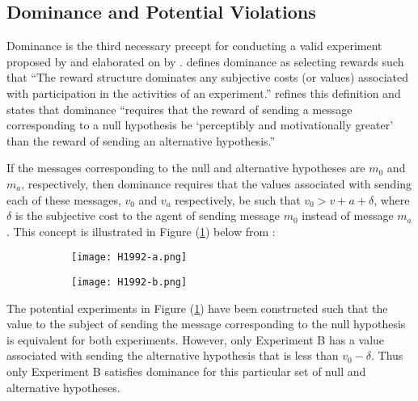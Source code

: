 \documentclass[../main.tex]{subfiles}
\begin{document}
\subsection{Dominance and Potential Violations}

Dominance is the third necessary precept for conducting a valid experiment proposed by \textcite{Smith1982} and elaborated on by \textcite{Harrison1989, Harrison1992}.
\textcite[934]{Smith1982} defines dominance as selecting rewards such that \enquote{The reward structure dominates any subjective costs (or values) associated with participation in the activities of an experiment.}
\textcite[1426]{Harrison1992} refines this definition and states that dominance \enquote{requires that the reward of sending a message corresponding to a null hypothesis be \enquote{perceptibly and motivationally greater} than the reward of sending an alternative hypothesis.}

If the messages corresponding to the null and alternative hypotheses are $m_0$ and $m_a$, respectively, then dominance requires that the values associated with sending each of these messages, $v_0$ and $v_a$ respectively, be such that $v_0 > v+a + \delta$, where $\delta$ is the subjective cost to the agent of sending message $m_0$ instead of message $m_a$ \parencite[1427]{Harrison1992}.
This concept is illustrated in Figure (\ref{fig:H1992:Dom-a}) below from \textcite[1427]{Harrison1992}:

\begin{figure}[h!]
	\centering
	\caption{ Flat Maximum Critique - \textcite{Harrison1992} }
	\label{fig:H1992:Dom}
	\begin{subfigure}{.5\textwidth}
		\centering
		\texttt{[image: H1992-a.png]}
		\caption{}
		\label{fig:H1992:Dom-a}
	\end{subfigure}%
	\begin{subfigure}{.5\textwidth}
		\centering
		\texttt{[image: H1992-b.png]}
		\caption{}
		\label{fig:H1992:Dom-b}
	\end{subfigure}
\end{figure}


The potential experiments in Figure (\ref{fig:H1992:Dom-a}) have been constructed such that the value to the subject of sending the message corresponding to the null hypothesis is equivalent for both experiments.
However, only Experiment B has a value associated with sending the alternative hypothesis that is less than $v_0 - \delta$.
Thus only Experiment B satisfies dominance for this particular set of null and alternative hypotheses.
\end{document}
